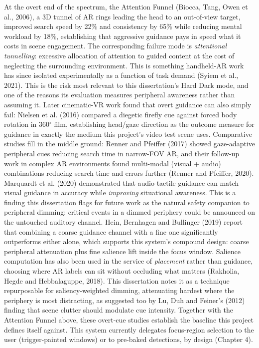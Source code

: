 At the overt end of the spectrum, the Attention Funnel (Biocca, Tang, Owen et al., 2006), a 3D
tunnel of AR rings leading the head to an out-of-view target, improved search speed by 22\% and
consistency by 65\% while reducing mental workload by 18\%, establishing that aggressive guidance
pays in speed what it costs in scene engagement. The corresponding failure mode is \textit{attentional
tunnelling}: excessive allocation of attention to guided content at the cost of neglecting the
surrounding environment. This is something handheld-AR work has since isolated experimentally as a function of
task demand (Syiem et al., 2021). This is the risk most relevant to this dissertation's Hard Dark
mode, and one of the reasons its evaluation measures peripheral awareness rather than assuming it.
Later cinematic-VR work found that overt guidance can also simply fail:
Nielsen et al. (2016) compared a diegetic firefly cue against forced body rotation in 360$^{\circ}$ film,
establishing head/gaze direction as the outcome measure for guidance in exactly the medium this
project's video test scene uses. Comparative studies fill in the middle ground: Renner and Pfeiffer
(2017) showed gaze-adaptive peripheral cues reducing search time in narrow-FOV AR, and their
follow-up work in complex AR environments found multi-modal (visual + audio) combinations reducing
search time and errors further (Renner and Pfeiffer, 2020). Marquardt et al. (2020) demonstrated
that audio-tactile guidance can match visual guidance in accuracy while \textit{improving} situational
awareness. This is a finding this dissertation flags for future work as the natural safety companion
to peripheral dimming: critical events in a dimmed periphery could be announced on the untouched
auditory channel. Hein, Bernhagen and Bullinger (2019) report that combining a coarse guidance
channel with a fine one significantly outperforms either alone, which supports this system's
compound design: coarse peripheral attenuation plus fine salience lift inside the focus window.
Salience computation has also been used in the service of \textit{placement} rather than guidance,
choosing where AR labels can sit without occluding what matters (Rakholia, Hegde and Hebbalaguppe,
2018). This dissertation notes it as a technique repurposable for saliency-weighted dimming,
attenuating hardest where the periphery is most distracting, as suggested too by Lu, Duh and Feiner's
(2012) finding that scene clutter should modulate cue intensity. Together with the Attention Funnel
above, these overt-cue studies establish the baseline this project defines itself against.
This system currently delegates focus-region selection to the user (trigger-painted windows) or to
pre-baked detections, by design (Chapter 4).


